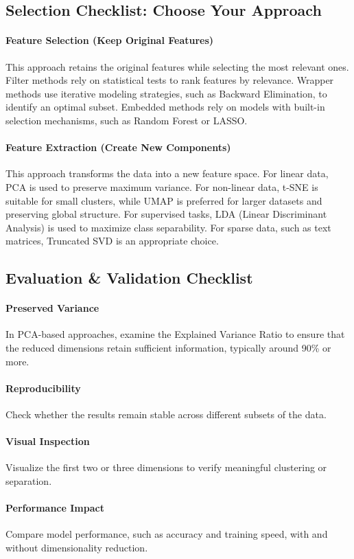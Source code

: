     \subsection{Selection Checklist: Choose Your Approach}
        
        \paragraph{Feature Selection (Keep Original Features)}
            This approach retains the original features while selecting the most relevant ones. Filter methods rely on statistical tests to rank features by relevance. Wrapper methods use iterative modeling strategies, such as Backward Elimination, to identify an optimal subset. Embedded methods rely on models with built-in selection mechanisms, such as Random Forest or LASSO.
        
        \paragraph{Feature Extraction (Create New Components)}
            This approach transforms the data into a new feature space. For linear data, PCA is used to preserve maximum variance. For non-linear data, t-SNE is suitable for small clusters, while UMAP is preferred for larger datasets and preserving global structure. For supervised tasks, LDA (Linear Discriminant Analysis) is used to maximize class separability. For sparse data, such as text matrices, Truncated SVD is an appropriate choice.

\subsection{Evaluation \& Validation Checklist}
    
    \paragraph{Preserved Variance}
        In PCA-based approaches, examine the Explained Variance Ratio to ensure that the reduced dimensions retain sufficient information, typically around 90\% or more.
    
    \paragraph{Reproducibility}
        Check whether the results remain stable across different subsets of the data.
    
    \paragraph{Visual Inspection}
        Visualize the first two or three dimensions to verify meaningful clustering or separation.
    
    \paragraph{Performance Impact}
        Compare model performance, such as accuracy and training speed, with and without dimensionality reduction.


